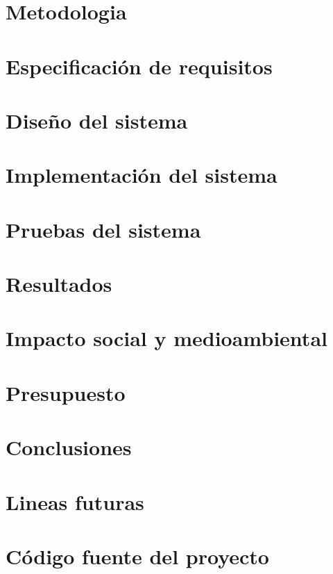 \documentclass[a4paper]{report}
\newcommand\paginablanco{%
    \null
    \thispagestyle{empty}%
    \newpage}
\begin{document}
\chapter{Metodologia}

\newpage

\chapter{Especificación de requisitos}

\newpage

\chapter{Diseño del sistema}

\newpage

\chapter{Implementación del sistema}

\newpage

\chapter{Pruebas del sistema}

\newpage

\chapter{Resultados}

\newpage

\chapter{Impacto social y medioambiental}

\newpage

\chapter{Presupuesto}

\newpage

\chapter{Conclusiones}

\newpage

\chapter{Lineas futuras}

\newpage

\printbibliography[heading=bibintoc]

\appendix
\clearpage
\addappheadtotoc
\appendixpage

\chapter{Código fuente del proyecto} %

\newpage
\paginablanco{}
\end{document}
